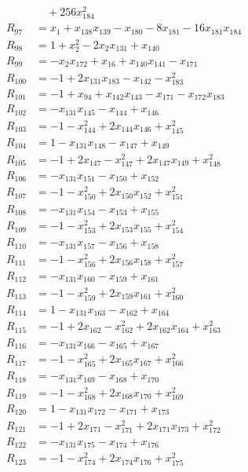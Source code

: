 \begin{align*}
&\quad +256x_{184}^{2}\\
R_{97} &= x_{1} +x_{138}x_{139} -x_{180} -8x_{181} -16x_{181}x_{184}\\
R_{98} &= 1 +x_{2}^{2} -2x_{2}x_{131} +x_{140}\\
R_{99} &= -x_{2}x_{172} +x_{16} +x_{140}x_{141} -x_{171}\\
R_{100} &= -1 +2x_{131}x_{183} -x_{142} -x_{183}^{2}\\
R_{101} &= -1 +x_{94} +x_{142}x_{143} -x_{171} -x_{172}x_{183}\\
R_{102} &= -x_{131}x_{145} -x_{144} +x_{146}\\
R_{103} &= -1 -x_{144}^{2} +2x_{144}x_{146} +x_{145}^{2}\\
R_{104} &= 1 -x_{131}x_{148} -x_{147} +x_{149}\\
R_{105} &= -1 +2x_{147} -x_{147}^{2} +2x_{147}x_{149} +x_{148}^{2}\\
R_{106} &= -x_{131}x_{151} -x_{150} +x_{152}\\
R_{107} &= -1 -x_{150}^{2} +2x_{150}x_{152} +x_{151}^{2}\\
R_{108} &= -x_{131}x_{154} -x_{153} +x_{155}\\
R_{109} &= -1 -x_{153}^{2} +2x_{153}x_{155} +x_{154}^{2}\\
R_{110} &= -x_{131}x_{157} -x_{156} +x_{158}\\
R_{111} &= -1 -x_{156}^{2} +2x_{156}x_{158} +x_{157}^{2}\\
R_{112} &= -x_{131}x_{160} -x_{159} +x_{161}\\
R_{113} &= -1 -x_{159}^{2} +2x_{159}x_{161} +x_{160}^{2}\\
R_{114} &= 1 -x_{131}x_{163} -x_{162} +x_{164}\\
R_{115} &= -1 +2x_{162} -x_{162}^{2} +2x_{162}x_{164} +x_{163}^{2}\\
R_{116} &= -x_{131}x_{166} -x_{165} +x_{167}\\
R_{117} &= -1 -x_{165}^{2} +2x_{165}x_{167} +x_{166}^{2}\\
R_{118} &= -x_{131}x_{169} -x_{168} +x_{170}\\
R_{119} &= -1 -x_{168}^{2} +2x_{168}x_{170} +x_{169}^{2}\\
R_{120} &= 1 -x_{131}x_{172} -x_{171} +x_{173}\\
R_{121} &= -1 +2x_{171} -x_{171}^{2} +2x_{171}x_{173} +x_{172}^{2}\\
R_{122} &= -x_{131}x_{175} -x_{174} +x_{176}\\
R_{123} &= -1 -x_{174}^{2} +2x_{174}x_{176} +x_{175}^{2}\\

\end{align*}
